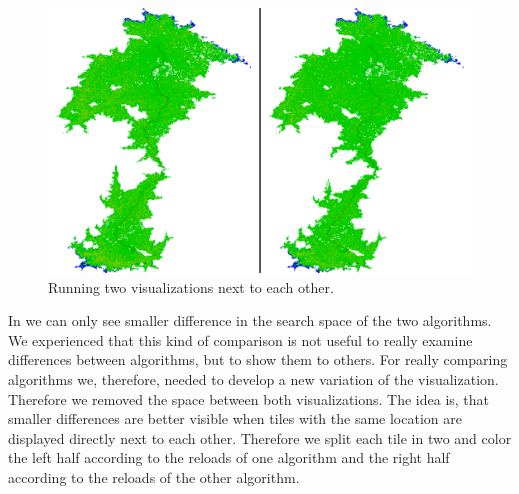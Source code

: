 \documentclass
[
    paper = a4,
    pagesize,
    12 pt,
    oneside,                       %
    open = right,
    DIV = calc,
    BCOR = 0 mm,                   %
    bibtotoc
]
{scrbook}
\begin{document}
\begin{figure}
    \includegraphics[width=\textwidth]{Images/vis-compare-two.png}
\caption[]{Running two visualizations next to each other.}
\label{fig:two_visualization}
\end{figure}

In  we can only see smaller difference in the search space of the two algorithms.
We experienced that this kind of comparison is not useful to really examine differences between algorithms, but to show them to others.
For really comparing algorithms we, therefore, needed to develop a new variation of the visualization.
Therefore we removed the space between both visualizations.
The idea is, that smaller differences are better visible when tiles with the same location are displayed directly next to each other.
Therefore we split each tile in two and color the left half according to the reloads of one algorithm and the right half according to the reloads of the other algorithm.
\end{document}
